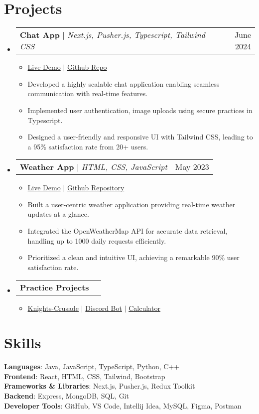 \documentclass[letterpaper,11pt]{article}
\makeatletter
\newcommand{\resumeItem}[1]{
  \item\small{
    {#1 \vspace{-4pt}}
  }
}
\newcommand{\resumeProjectHeading}[2]{
    \item
    \begin{tabular*}{0.97\textwidth}{l@{\extracolsep{\fill}}r}
      \small#1 & #2 \\
    \end{tabular*}\vspace{-7pt}
}
\newcommand{\resumeSubHeadingListStart}{\begin{itemize}[leftmargin=0.15in, label={}]}
\newcommand{\resumeSubHeadingListEnd}{\end{itemize}}
\newcommand{\resumeItemListStart}{\begin{itemize}[leftmargin=0.15in]}
\newcommand{\resumeItemListEnd}{\end{itemize}\vspace{-6pt}}
\makeatother
\begin{document}
\section{Projects}
   \resumeSubHeadingListStart
     \resumeProjectHeading
         {\textbf{Chat App} $|$ \emph{Next.js, Pusher.js, Typescript, Tailwind CSS}}{June 2024}
         \resumeItemListStart
           \resumeItem{\href{https://chat-app-swart-psi.vercel.app/} {Live Demo} $|$ \href{https://github.com/JaiSwarup/chat-app} {Github Repo}}
           \resumeItem{Developed a highly scalable chat application enabling seamless communication with real-time features.}
           \resumeItem{Implemented user authentication, image uploads using secure practices in Typescript.}
           \resumeItem{Designed a user-friendly and responsive UI with Tailwind CSS, leading to a 95\% satisfaction rate from 20+ users.}
         \resumeItemListEnd
     \resumeProjectHeading
         {\textbf{Weather App} $|$ \emph{HTML, CSS, JavaScript}}{May 2023}
         \resumeItemListStart
         \resumeItem{\href{https://jaiswarup.github.io/weatherapp.github.io/} {Live Demo} $|$ \href{https://github.com/JaiSwarup/weatherapp} {Github Repository}}
           \resumeItem{Built a user-centric weather application providing real-time weather updates at a glance.}
           \resumeItem{Integrated the OpenWeatherMap API for accurate data retrieval, handling up to 1000 daily requests efficiently.}
           \resumeItem{Prioritized a clean and intuitive UI, achieving a remarkable 90\% user satisfaction rate.}
         \resumeItemListEnd
     \resumeProjectHeading
         {\textbf{Practice Projects}}{}
         \resumeItemListStart
         \resumeItem{\href{https://github.com/JaiSwarup/knights-crusade} {Knights-Crusade} $|$ \href{https://github.com/JaiSwarup/MemeBot} {Discord Bot} $|$ \href{https://github.com/JaiSwarup/calculatorapp.github.io} {Calculator}
         } 
         \resumeItemListEnd
   \resumeSubHeadingListEnd

\section{Skills}
 \begin{itemize}[leftmargin=0.15in, label={}]
    \small{\item{
     \textbf{Languages}{: Java, JavaScript, TypeScript, Python, C++} \\
    \textbf{Frontend}{: React, HTML, CSS, Tailwind, Bootstrap} \\
     \textbf{Frameworks \& Libraries}{: Next.js, Pusher.js,  Redux Toolkit} \\
    \textbf{Backend}{: Express, MongoDB, SQL, Git} \\
     \textbf{Developer Tools}{: GitHub, VS Code, Intellij Idea, MySQL, Figma, Postman} \\
    }}
 \end{itemize}
\end{document}
